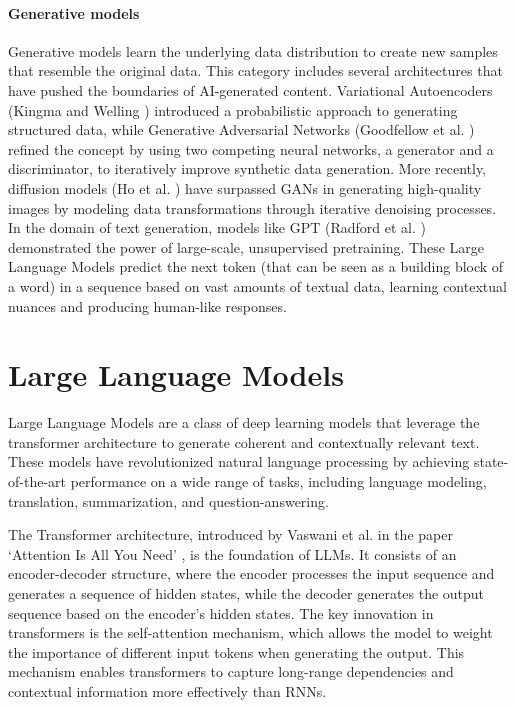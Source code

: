 \paragraph{Generative models}
Generative models learn the underlying data distribution to create new samples that
resemble the original data. This category includes several architectures that
have pushed the boundaries of AI-generated content. Variational Autoencoders (Kingma
and Welling \cite{kingma2022autoencodingvariationalbayes}) introduced a probabilistic
approach to generating structured data, while Generative Adversarial Networks (Goodfellow
et al. \cite{goodfellow2014generativeadversarialnetworks}) refined the concept by
using two competing neural networks, a generator and a discriminator, to iteratively
improve synthetic data generation. More recently, diffusion models (Ho et al. \cite{ho2020denoisingdiffusionprobabilisticmodels})
have surpassed GANs in generating high-quality images by modeling data
transformations through iterative denoising processes. In the domain of text generation,
models like GPT (Radford et al. \cite{radford2018improving}) demonstrated the power
of large-scale, unsupervised pretraining. These Large Language Models predict the
next token (that can be seen as a building block of a word) in a sequence based on
vast amounts of textual data, learning contextual nuances and producing human-like
responses.

\section{Large Language Models}
\label{sec:large_language_models_llms}

Large Language Models are a class of deep learning models that leverage the transformer
architecture to generate coherent and contextually relevant text. These models
have revolutionized natural language processing by achieving state-of-the-art
performance on a wide range of tasks, including language modeling, translation, summarization,
and question-answering.

The Transformer architecture, introduced by Vaswani et al. in the paper `Attention
Is All You Need' \cite{vaswani2023attentionneed}, is the foundation of LLMs. It
consists of an encoder-decoder structure, where the encoder processes the input sequence
and generates a sequence of hidden states, while the decoder generates the
output sequence based on the encoder's hidden states. The key innovation in transformers
is the self-attention mechanism, which allows the model to weight the importance
of different input tokens when generating the output. This mechanism enables transformers
to capture long-range dependencies and contextual information more effectively than
RNNs.

